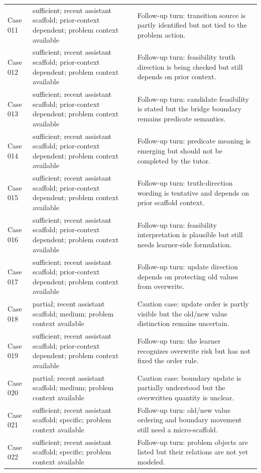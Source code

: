 \documentclass[11pt]{article}
\begin{document}
\begin{landscape}
\begin{xltabular}{\textwidth}{>{\raggedright\arraybackslash}p{0.08\textwidth}>{\raggedright\arraybackslash}p{0.34\textwidth}>{\raggedright\arraybackslash}X}
Case 011 & sufficient; recent assistant scaffold; prior-context dependent; problem context available & Follow-up turn: transition source is partly identified but not tied to the problem action. \\
Case 012 & sufficient; recent assistant scaffold; prior-context dependent; problem context available & Follow-up turn: feasibility truth direction is being checked but still depends on prior context. \\
Case 013 & sufficient; recent assistant scaffold; prior-context dependent; problem context available & Follow-up turn: candidate feasibility is stated but the bridge boundary remains predicate semantics. \\
Case 014 & sufficient; recent assistant scaffold; prior-context dependent; problem context available & Follow-up turn: predicate meaning is emerging but should not be completed by the tutor. \\
Case 015 & sufficient; recent assistant scaffold; prior-context dependent; problem context available & Follow-up turn: truth-direction wording is tentative and depends on prior scaffold context. \\
Case 016 & sufficient; recent assistant scaffold; prior-context dependent; problem context available & Follow-up turn: feasibility interpretation is plausible but still needs learner-side formulation. \\
Case 017 & sufficient; recent assistant scaffold; prior-context dependent; problem context available & Follow-up turn: update direction depends on protecting old values from overwrite. \\
Case 018 & partial; recent assistant scaffold; medium; problem context available & Caution case: update order is partly visible but the old/new value distinction remains uncertain. \\
Case 019 & sufficient; recent assistant scaffold; prior-context dependent; problem context available & Follow-up turn: the learner recognizes overwrite risk but has not fixed the order rule. \\
Case 020 & partial; recent assistant scaffold; medium; problem context available & Caution case: boundary update is partially understood but the overwritten quantity is unclear. \\
Case 021 & sufficient; recent assistant scaffold; specific; problem context available & Follow-up turn: old/new value ordering and boundary movement still need a micro-scaffold. \\
Case 022 & sufficient; recent assistant scaffold; specific; problem context available & Follow-up turn: problem objects are listed but their relations are not yet modeled. \\

\end{xltabular}
\end{landscape}
\end{document}

